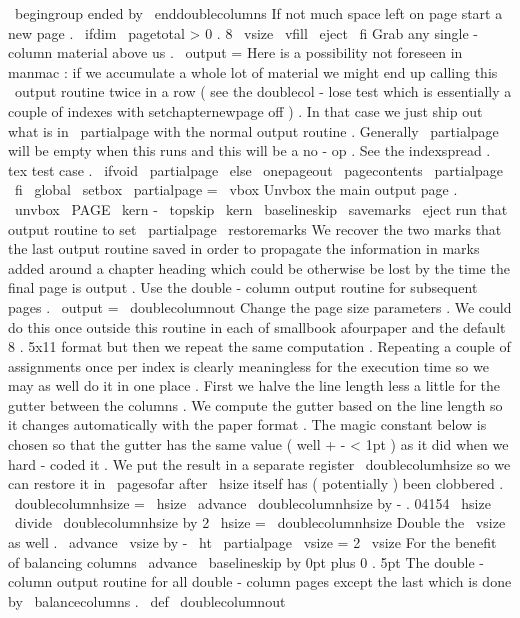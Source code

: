 {{{{
\
begingroup
%
ended
by
\
enddoublecolumns
%
If
not
much
space
left
on
page
start
a
new
page
.
\
ifdim
\
pagetotal
>
0
.
8
\
vsize
\
vfill
\
eject
\
fi
%
%
Grab
any
single
-
column
material
above
us
.
\
output
=
{
%
%
%
Here
is
a
possibility
not
foreseen
in
manmac
:
if
we
accumulate
a
%
whole
lot
of
material
we
might
end
up
calling
this
\
output
%
routine
twice
in
a
row
(
see
the
doublecol
-
lose
test
which
is
%
essentially
a
couple
of
indexes
with
setchapternewpage
off
)
.
In
%
that
case
we
just
ship
out
what
is
in
\
partialpage
with
the
normal
%
output
routine
.
Generally
\
partialpage
will
be
empty
when
this
%
runs
and
this
will
be
a
no
-
op
.
See
the
indexspread
.
tex
test
case
.
\
ifvoid
\
partialpage
\
else
\
onepageout
{
\
pagecontents
\
partialpage
}
%
\
fi
%
\
global
\
setbox
\
partialpage
=
\
vbox
{
%
%
Unvbox
the
main
output
page
.
\
unvbox
\
PAGE
\
kern
-
\
topskip
\
kern
\
baselineskip
}
%
\
savemarks
}
%
\
eject
%
run
that
output
routine
to
set
\
partialpage
\
restoremarks
%
%
We
recover
the
two
marks
that
the
last
output
routine
saved
in
order
%
to
propagate
the
information
in
marks
added
around
a
chapter
heading
%
which
could
be
otherwise
be
lost
by
the
time
the
final
page
is
output
.
%
%
%
Use
the
double
-
column
output
routine
for
subsequent
pages
.
\
output
=
{
\
doublecolumnout
}
%
%
%
Change
the
page
size
parameters
.
We
could
do
this
once
outside
this
%
routine
in
each
of
smallbook
afourpaper
and
the
default
8
.
5x11
%
format
but
then
we
repeat
the
same
computation
.
Repeating
a
couple
%
of
assignments
once
per
index
is
clearly
meaningless
for
the
%
execution
time
so
we
may
as
well
do
it
in
one
place
.
%
%
First
we
halve
the
line
length
less
a
little
for
the
gutter
between
%
the
columns
.
We
compute
the
gutter
based
on
the
line
length
so
it
%
changes
automatically
with
the
paper
format
.
The
magic
constant
%
below
is
chosen
so
that
the
gutter
has
the
same
value
(
well
+
-
<
1pt
)
%
as
it
did
when
we
hard
-
coded
it
.
%
%
We
put
the
result
in
a
separate
register
\
doublecolumhsize
so
we
%
can
restore
it
in
\
pagesofar
after
\
hsize
itself
has
(
potentially
)
%
been
clobbered
.
%
\
doublecolumnhsize
=
\
hsize
\
advance
\
doublecolumnhsize
by
-
.
04154
\
hsize
\
divide
\
doublecolumnhsize
by
2
\
hsize
=
\
doublecolumnhsize
%
%
Double
the
\
vsize
as
well
.
\
advance
\
vsize
by
-
\
ht
\
partialpage
\
vsize
=
2
\
vsize
%
%
For
the
benefit
of
balancing
columns
\
advance
\
baselineskip
by
0pt
plus
0
.
5pt
}
%
The
double
-
column
output
routine
for
all
double
-
column
pages
except
%
the
last
which
is
done
by
\
balancecolumns
.
%
\
def
\
doublecolumnout
}}}
